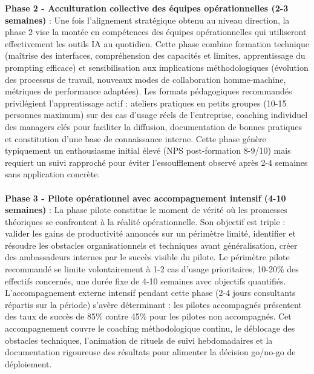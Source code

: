 \textbf{Phase 2 - Acculturation collective des équipes opérationnelles (2-3 semaines)} : Une fois l'alignement stratégique obtenu au niveau direction, la phase 2 vise la montée en compétences des équipes opérationnelles qui utiliseront effectivement les outils IA au quotidien. Cette phase combine formation technique (maîtrise des interfaces, compréhension des capacités et limites, apprentissage du prompting efficace) et sensibilisation aux implications méthodologiques (évolution des processus de travail, nouveaux modes de collaboration homme-machine, métriques de performance adaptées). Les formats pédagogiques recommandés privilégient l'apprentissage actif : ateliers pratiques en petits groupes (10-15 personnes maximum) sur des cas d'usage réels de l'entreprise, coaching individuel des managers clés pour faciliter la diffusion, documentation de bonnes pratiques et constitution d'une base de connaissance interne. Cette phase génère typiquement un enthousiasme initial élevé (NPS post-formation 8-9/10) mais requiert un suivi rapproché pour éviter l'essoufflement observé après 2-4 semaines sans application concrète.
\\\\
\textbf{Phase 3 - Pilote opérationnel avec accompagnement intensif (4-10 semaines)} : La phase pilote constitue le moment de vérité où les promesses théoriques se confrontent à la réalité opérationnelle. Son objectif est triple : valider les gains de productivité annoncés sur un périmètre limité, identifier et résoudre les obstacles organisationnels et techniques avant généralisation, créer des ambassadeurs internes par le succès visible du pilote. Le périmètre pilote recommandé se limite volontairement à 1-2 cas d'usage prioritaires, 10-20\% des effectifs concernés, une durée fixe de 4-10 semaines avec objectifs quantifiés. L'accompagnement externe intensif pendant cette phase (2-4 jours consultants répartis sur la période) s'avère déterminant : les pilotes accompagnés présentent des taux de succès de 85\% contre 45\% pour les pilotes non accompagnés. Cet accompagnement couvre le coaching méthodologique continu, le déblocage des obstacles techniques, l'animation de rituels de suivi hebdomadaires et la documentation rigoureuse des résultats pour alimenter la décision go/no-go de déploiement.
\\\\
